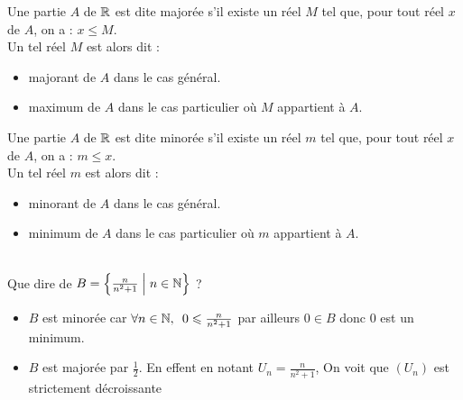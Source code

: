 \begin{defi}
	Une partie \(A\) de \(\mathbb{R}\) est dite majorée s’il existe un réel \(M\) tel que, pour tout réel \(x\) de \(A\), on a : \(x \leq M\). \\
	Un tel réel \(M\) est alors dit :
	\begin{itemize}
		\item majorant de \(A\) dans le cas général. \\
		\item maximum de \(A\) dans le cas particulier où \(M\) appartient à \(A\).\\
	\end{itemize}

\end{defi}

\begin{defi}
	Une partie \(A\) de \(\mathbb{R}\) est dite minorée s’il existe un réel \(m\) tel que, pour tout réel \(x\) de \(A\), on a : \(m\leq x\). \\
	Un tel réel \(m\) est alors dit :
	\begin{itemize}
		\item minorant  de \(A\) dans le cas général. \\
		\item minimum  de \(A\) dans le cas particulier où \(m\) appartient à \(A\).\\
	\end{itemize}

\end{defi}

\begin{exoex}
    ~\\
	Que dire de \(B = \left\lbrace\frac{n}{n^2+1} \;\middle|\; n \in \mathbb{N}\right\rbrace\) ?
\end{exoex}

\begin{corr}
	\begin{itemize}

		\item \(B\) est minorée car \( \quantifs{\forall n \in \N} 0 \leq \frac{n}{n^2+1} \) par ailleurs \(0 \in B\) donc \(0\) est un minimum. \\
		\item \(B\) est majorée par \(\frac{1}{2}\). En effent en notant \(U_n = \frac{n}{n^2+1}\), On voit que \((U_n)\) est strictement décroissante
	\end{itemize}
\end{corr}

